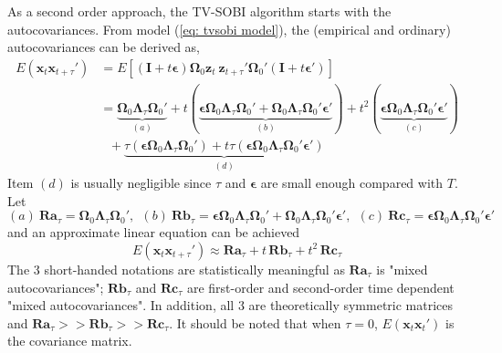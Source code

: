\documentclass[utf8,english]{gradu3}
\begin{document}
As a second order approach, the TV-SOBI algorithm starts with the autocovariances. From model (\ref{eq: tvsobi model}), the (empirical and ordinary) autocovariances can be derived as,
\begin{equation*}
    \begin{aligned}
E(\boldsymbol x_t \boldsymbol x_{t+\tau}') & = E[( \boldsymbol I + t \boldsymbol{\epsilon})\boldsymbol \Omega_0 \boldsymbol  z_t\ \boldsymbol  z_{t+\tau} ' \boldsymbol \Omega_0 '( \boldsymbol I + t \boldsymbol{\epsilon}')]
\\ &= \underbrace{\boldsymbol\Omega_0 \boldsymbol\Lambda_\tau \boldsymbol \Omega_0'}_{(a)}
 + t (\underbrace{ \boldsymbol{\epsilon } \boldsymbol\Omega_0 \boldsymbol\Lambda_\tau \boldsymbol \Omega_0' +  \boldsymbol\Omega_0 \boldsymbol\Lambda_\tau \boldsymbol \Omega_0' \boldsymbol{\epsilon}'} _{(b)} )
 + t^2 (\underbrace{\boldsymbol{\epsilon} \boldsymbol\Omega_0 \boldsymbol\Lambda_\tau \boldsymbol \Omega_0' \boldsymbol{\epsilon}'}_{(c)})
  \\ &\ \ \  + \underbrace {\tau (\boldsymbol{\epsilon} \boldsymbol\Omega_0 \boldsymbol\Lambda_\tau \boldsymbol \Omega_0')
 + t \tau (\boldsymbol{\epsilon} \boldsymbol\Omega_0 \boldsymbol\Lambda_\tau \boldsymbol \Omega_0' \boldsymbol{\epsilon}')}_{(d)}
\end{aligned}
\end{equation*}
Item $(d)$ is usually negligible since $\tau$ and $\boldsymbol{\epsilon}$ are small enough compared with $T$. Let $(a)\ \boldsymbol{Ra}_\tau = \boldsymbol\Omega_0 \boldsymbol\Lambda_\tau \boldsymbol \Omega_0',\ \ (b)\ \boldsymbol{Rb}_\tau = \boldsymbol{\epsilon} \boldsymbol\Omega_0 \boldsymbol\Lambda_\tau \boldsymbol \Omega_0' +  \boldsymbol\Omega_0 \boldsymbol\Lambda_\tau \boldsymbol \Omega_0' \boldsymbol{\epsilon}',\ \ (c)\ \boldsymbol{Rc}_\tau = \boldsymbol{\epsilon} \boldsymbol\Omega_0 \boldsymbol\Lambda_\tau \boldsymbol \Omega_0' \boldsymbol{\epsilon}'$ and an approximate linear equation can be achieved
\begin{equation}
\label{eq: covariance structure}
    E(\boldsymbol x_t \boldsymbol x_{t+\tau}') \approx  \boldsymbol{Ra}_\tau + t\, \boldsymbol{Rb}_\tau + t^2\, \boldsymbol{Rc}_\tau
\end{equation}
The 3 short-handed notations are statistically meaningful as $\boldsymbol{Ra}_\tau$ is "mixed autocovariances"; $\boldsymbol{Rb}_\tau$ and $\boldsymbol{Rc}_\tau$ are first-order and second-order time dependent "mixed autocovariances". In addition, all 3 are theoretically symmetric matrices and $\boldsymbol{Ra}_\tau >> \boldsymbol{Rb}_\tau >> \boldsymbol{Rc}_\tau$. It should be noted that when $\tau=0$, $E(\boldsymbol{x}_t \boldsymbol{x}_{t}')$ is the covariance matrix.
\end{document}
